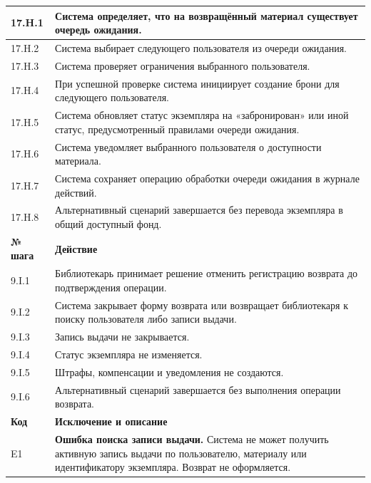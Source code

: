 \documentclass[12pt,a4paper]{article}
\begin{document}
\begin{xltabular}{\textwidth}{
				|>{\raggedright\arraybackslash}p{2.7cm}
				|>{\raggedright\arraybackslash}X|
			}
			17.H.1 & Система определяет, что на возвращённый материал существует очередь
			ожидания. \\
			\hline
			17.H.2 & Система выбирает следующего пользователя из очереди ожидания. \\
			\hline
			17.H.3 & Система проверяет ограничения выбранного пользователя. \\
			\hline
			17.H.4 & При успешной проверке система инициирует создание брони для
			следующего пользователя. \\
			\hline
			17.H.5 & Система обновляет статус экземпляра на «забронирован» или иной
			статус, предусмотренный правилами очереди ожидания. \\
			\hline
			17.H.6 & Система уведомляет выбранного пользователя о доступности материала. \\
			\hline
			17.H.7 & Система сохраняет операцию обработки очереди ожидания в журнале
			действий. \\
			\hline
			17.H.8 & Альтернативный сценарий завершается без перевода экземпляра в
			общий доступный фонд. \\
			\hline
			
			
			\textbf{№ шага} & \textbf{Действие} \\
			\hline
			
			9.I.1 & Библиотекарь принимает решение отменить регистрацию возврата до
			подтверждения операции. \\
			\hline
			9.I.2 & Система закрывает форму возврата или возвращает библиотекаря к
			поиску пользователя либо записи выдачи. \\
			\hline
			9.I.3 & Запись выдачи не закрывается. \\
			\hline
			9.I.4 & Статус экземпляра не изменяется. \\
			\hline
			9.I.5 & Штрафы, компенсации и уведомления не создаются. \\
			\hline
			9.I.6 & Альтернативный сценарий завершается без выполнения операции
			возврата. \\
			\hline
			
			
			\textbf{Код} & \textbf{Исключение и описание} \\
			\hline
			
			E1 &
			\textbf{Ошибка поиска записи выдачи.}
			Система не может получить активную запись выдачи по пользователю,
			материалу или идентификатору экземпляра. Возврат не оформляется. \\
			\hline
			

\end{xltabular}
\end{document}
